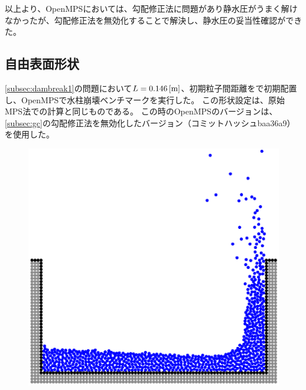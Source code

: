 		以上より、OpenMPSにおいては、勾配修正法に問題があり静水圧がうまく解けなかったが、勾配修正法を無効化することで解決し、静水圧の妥当性確認ができた。

	\subsection{自由表面形状 \label{subsec:dambreak1_result}}
		\cref{subsec:dambreak1}の問題において$L=\SI{0.146}{[m]}$、初期粒子間距離をで初期配置し、OpenMPSで水柱崩壊ベンチマークを実行した。
		この形状設定は、原始MPS法での計算\Cite{ref:mps}と同じものである。
		この時のOpenMPSのバージョンは、 \cref{subsec:gc}の勾配修正法を無効化したバージョン（コミットハッシュbaa36a9）を使用した。

		\begin{figure} \centering
			\begin{minipage}{\linewidth} \centering
				\includegraphics[clip, width=\linewidth]{img/dambreak1_snap.png}
			\end{minipage}
			\begin{minipage}{\linewidth} \centering

\end{minipage}
\end{figure}
